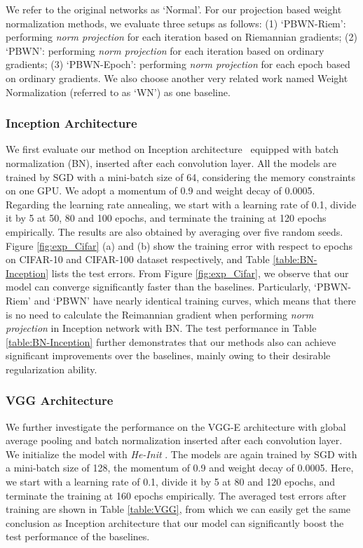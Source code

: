 \documentclass[twocolumn]{article}
\begin{document}
We refer to the original networks  as `Normal'.
For our projection based weight normalization methods, we evaluate three setups as follows: (1) `PBWN-Riem': performing \emph{norm projection} for each iteration based on Riemannian gradients; (2) `PBWN': performing \emph{norm projection} for each iteration based on ordinary gradients; (3) `PBWN-Epoch': performing \emph{norm projection} for each epoch based on ordinary gradients. We also choose another very related work named Weight Normalization \cite{2016_CoRR_Salimans} (referred to as `WN') as one baseline.

\subsubsection{Inception Architecture}
We first evaluate our method on Inception architecture~\cite{2014_CoRR_Szegedy} equipped with batch normalization (BN), inserted after each convolution layer. All the models are trained by SGD with a mini-batch size of 64, considering the memory constraints on one GPU. We adopt a momentum of 0.9 and weight decay of 0.0005. Regarding the learning rate annealing, we start with a learning rate of 0.1, divide it by 5 at 50, 80 and 100 epochs, and terminate the training at 120 epochs empirically. The results are also obtained by averaging over five random seeds. Figure \ref{fig:exp_Cifar} (a) and (b) show the training error with respect to epochs on CIFAR-10 and CIFAR-100 dataset respectively, and Table \ref{table:BN-Inception} lists the test errors. From Figure \ref{fig:exp_Cifar}, we observe that our model can converge significantly faster than the baselines. Particularly, `PBWN-Riem' and `PBWN' have nearly identical training curves, which means that there is no need to calculate the Reimannian gradient when performing \emph{norm projection} in Inception network with BN. The test performance in Table \ref{table:BN-Inception} further demonstrates that our methods also can achieve significant improvements over the baselines, mainly owing to their desirable regularization ability.



\subsubsection{VGG Architecture}
We further investigate the performance on the VGG-E architecture \cite{2014_CoRR_Simonyan} with global average pooling and batch normalization inserted after each convolution layer. We initialize the model with \emph{He-Init} \cite{2015_ICCV_He}. The models are again trained by SGD with a mini-batch size of 128, the momentum of 0.9 and weight decay of 0.0005. Here, we start with a learning rate of 0.1, divide it by 5 at 80 and 120 epochs, and terminate the training at 160 epochs empirically. The averaged test errors after training are shown in Table \ref{table:VGG}, from which we can easily get the same conclusion as Inception architecture that our model can significantly boost the test performance of the baselines.
\end{document}
